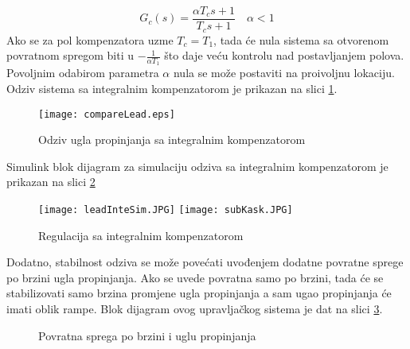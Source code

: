 \begin{equation}
    G_c(s) = \frac{\alpha T_cs+1}{T_cs+1}  \quad \alpha<1
\end{equation}
Ako se za pol kompenzatora uzme $T_c = T_1$, tada će nula sistema sa otvorenom 
povratnom spregom biti u $-\frac{1}{\alpha T_1}$ što daje veću kontrolu nad postavljanjem 
polova. Povoljnim odabirom parametra $\alpha$ nula se može postaviti na proivoljnu lokaciju.
Odziv sistema sa integralnim kompenzatorom je prikazan na slici \ref{fig:komp}.
\begin{figure}[!ht]
    \centering
    \texttt{[image: compareLead.eps]}
    \caption{Odziv ugla propinjanja sa integralnim kompenzatorom}
    \label{fig:komp}
\end{figure}
Simulink blok dijagram za simulaciju odziva sa integralnim kompenzatorom je prikazan na 
slici \ref{fig:leadSim}
\begin{figure}[!ht]
    \centering
    \texttt{[image: leadInteSim.JPG]}
    \texttt{[image: subKask.JPG]}
    \caption{Regulacija sa integralnim kompenzatorom}
    \label{fig:leadSim}
\end{figure}
Dodatno, stabilnost odziva se može povećati uvođenjem dodatne povratne sprege po brzini 
ugla propinjanja. Ako se uvede povratna samo po brzini, tada će se stabilizovati samo 
brzina promjene ugla propinjanja a sam ugao propinjanja će imati oblik rampe. 
Blok dijagram ovog upravljačkog sistema je dat na slici \ref{fig:kask}.
\begin{figure}[!ht]
    \centering
\caption{Povratna sprega po brzini i uglu propinjanja}
\label{fig:kask}
\end{figure}
